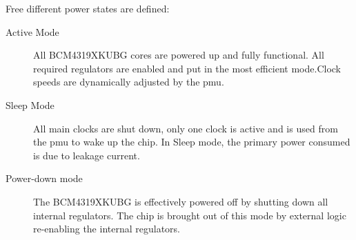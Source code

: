 \documentclass[11pt,a4paper,titlepage]{article}
\begin{document}
		Free different power states are defined:
		\begin{description}
			\item [Active Mode] All BCM4319XKUBG cores are powered up and fully functional. All required regulators are enabled and put in the most efficient mode.Clock speeds are dynamically adjusted by the \gls{pmu}.
			\item [Sleep Mode] All main clocks are shut down, only one clock is active and is used from the \gls{pmu} to wake up the chip. In Sleep mode, the primary power consumed is due to leakage current.
			\item	[Power-down mode] The BCM4319XKUBG is effectively powered off by shutting down all internal regulators. The chip is brought out of this mode by external logic re-enabling the internal regulators.

		\end{description}




\end{document}
